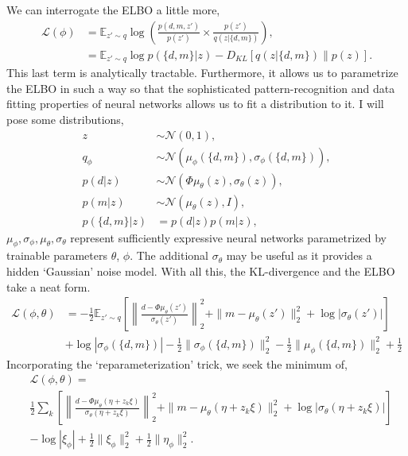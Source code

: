 \documentclass[12pt]{article}
\begin{document}
We can interrogate the ELBO a little more,  
\begin{align}
\mathcal{L}(\phi)&=\mathbb{E}_{z' \sim q}\log {\left(\frac{p(d,m, z')}{p(z')} \times \frac{p(z')}{q(z | \{d, m\})}\right)},\nonumber\\
&=\mathbb{E}_{z' \sim q}\log {p(\{d,m\}| z)}-D_{KL}[q(z| \{d, m\})\|p(z)].
\end{align}
This last term is analytically tractable. Furthermore, it allows us to parametrize the ELBO in such a way so that the sophisticated pattern-recognition and data fitting properties of neural networks allows us to fit a distribution to it. I will pose some distributions,
\begin{align}
z & \sim \mathcal{N}(0,1),\\
q_\phi & \sim \mathcal{N}(\mu_{\phi}(\{d, m\}), \sigma_{\phi}(\{d, m\})),\\
p(d|z) & \sim \mathcal{N}(\Phi \mu_{\theta}(z), \sigma_{\theta}(z) ),\\
p(m|z) & \sim \mathcal{N}(\mu_{\theta}(z), I),\\
p(\{d,m\}|z) & = p(d|z)p(m|z),
\end{align}
$\mu_{\phi}, \sigma_{\phi}, \mu_{\theta},  \sigma_{\theta}$ represent sufficiently expressive neural networks parametrized by trainable parameters $\theta$, $\phi$. The additional $\sigma_{\theta}$ may be useful as it provides a hidden `Gaussian' noise model.  With all this, the KL-divergence and the ELBO take a neat form.
\begin{align}
\mathcal{L}(\phi, \theta)&=-\frac{1}{2}\mathbb{E}_{z' \sim q}\left[ \left\|\frac{d-\Phi \mu_{\theta}(z')}{\sigma_{\theta}(z')}\right\|_2^2 
+ \|m- \mu_{\theta}(z')\|_2^2+ \log{|\sigma_{\theta}(z')|}\right] \nonumber\\
&+\log{|\sigma_{\phi}(\{d, m\})|}-\frac{1}{2}\|\sigma_{\phi}(\{d, m\})\|_2^2-\frac{1}{2}\|\mu_{\phi}(\{d, m\})\|_2^2+\frac{1}{2}
\end{align}
Incorporating the `reparameterization' trick, we seek the minimum of,
\begin{align}
&\mathcal{L}(\phi, \theta)=\nonumber\\
&\frac{1}{2}\sum_k\left[ 
\left\|\frac{d-\Phi \mu_{\theta}(\eta+z_{k} \xi)}{\sigma_{\theta}(\eta+z_{k} \xi)}\right\|_2^2 
+ \|m- \mu_{\theta}(\eta+z_{k} \xi)\|_2^2
+ \log{|\sigma_{\theta}(\eta+z_{k} \xi)|}
\right]\nonumber\\
&-\log{|\xi_{\phi}|}+\frac{1}{2}\|\xi_{\phi}\|_2^2+\frac{1}{2}\|\eta_{\phi}\|_2^2. \label{eqn:Lphietaxi}
\end{align}
\end{document}
